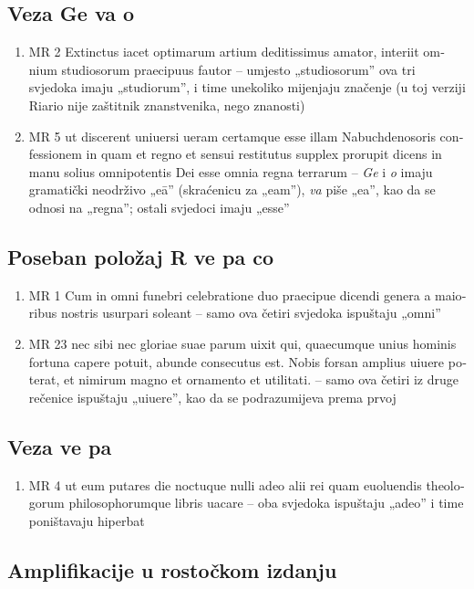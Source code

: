\documentclass[a5paper,twoside]{article}
\begin{document}
\subsection{Veza Ge va o}
\begin{enumerate}[label=\alph*)]
\item MR 2 \textlatin{Extinctus iacet optimarum artium deditissimus amator, interiit omnium studiosorum praecipuus fautor} – umjesto „studiosorum” ova tri svjedoka imaju „studiorum”, i time unekoliko mijenjaju značenje (u toj verziji Riario nije zaštitnik znanstvenika, nego znanosti)
\item MR 5 \textlatin{ut discerent uniuersi ueram certamque esse illam Nabuchdenosoris confessionem in quam et regno et sensui restitutus supplex prorupit dicens in manu solius omnipotentis Dei esse omnia regna terrarum} – \textit{Ge} i \textit{o} imaju gramatički neodrživo „eā” (skraćenicu za „eam”), \textit{va} piše „ea”, kao da se odnosi na „regna”; ostali svjedoci imaju „esse”
\end{enumerate}
\subsection{Poseban položaj R ve pa co}
\begin{enumerate}[label=\alph*)]
\item MR 1 \textlatin{Cum in omni funebri celebratione duo praecipue dicendi genera a maioribus nostris usurpari soleant} – samo ova četiri svjedoka ispuštaju „omni”
\item MR 23 \textlatin{nec sibi nec gloriae suae parum uixit qui, quaecumque unius hominis fortuna capere potuit, abunde consecutus est. Nobis forsan amplius uiuere poterat, et nimirum magno et ornamento et utilitati.} – samo ova četiri iz druge rečenice ispuštaju „uiuere”, kao da se podrazumijeva prema prvoj
\end{enumerate}
\subsection{Veza ve pa}
\begin{enumerate}[label=\alph*)]
\item MR 4 \textlatin{ut eum putares die noctuque nulli adeo alii rei quam euoluendis theologorum philosophorumque libris uacare} – oba svjedoka ispuštaju „adeo” i time poništavaju hiperbat
\end{enumerate}

\subsection{Amplifikacije u rostočkom izdanju}
\end{document}
